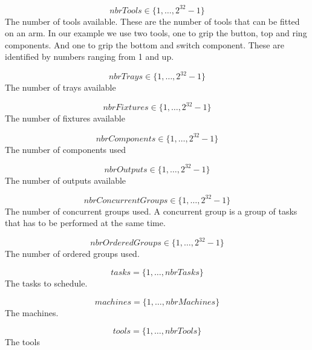 \documentclass[10pt,a4paper]{report}
\begin{document}
\begin{equation}\label{eq:3}
nbrTools \in \{1 , \ldots , 2^{32}-1\}
\end{equation}
The number of tools available. These are the number of tools that can be fitted on an arm. In our example we use two tools, one to grip the button, top and ring components. And one to grip the bottom and switch component. These are identified by numbers ranging from 1 and up.

\begin{equation}\label{eq:4}
nbrTrays \in \{1 , \ldots , 2^{32}-1\}
\end{equation}
The number of trays available

\begin{equation}\label{eq:5}
nbrFixtures \in \{1 , \ldots , 2^{32}-1\}
\end{equation}
The number of fixtures available

\begin{equation}\label{eq:6}
nbrComponents \in \{1 , \ldots , 2^{32}-1\}
\end{equation}
The number of components used

\begin{equation}\label{eq:7}
nbrOutputs \in \{1 , \ldots , 2^{32}-1\}
\end{equation}
The number of outputs available

\begin{equation}\label{eq:8}
nbrConcurrentGroups \in \{1 , \ldots , 2^{32}-1\}
\end{equation}
The number of concurrent groups used. A concurrent group is a group of tasks that has to be performed at the same time.

\begin{equation}\label{eq:9}
nbrOrderedGroups \in \{1 , \ldots , 2^{32}-1\}
\end{equation}
The number of ordered groups used.

\begin{equation}\label{eq:10}
tasks = \{1 , \ldots , nbrTasks\}\end{equation}
The tasks to schedule.

\begin{equation}\label{eq:11}
machines = \{1 , \ldots , nbrMachines\}\end{equation}
The machines.

\begin{equation}\label{eq:12}
tools = \{1 , \ldots , nbrTools\}\end{equation}
The tools
\end{document}
